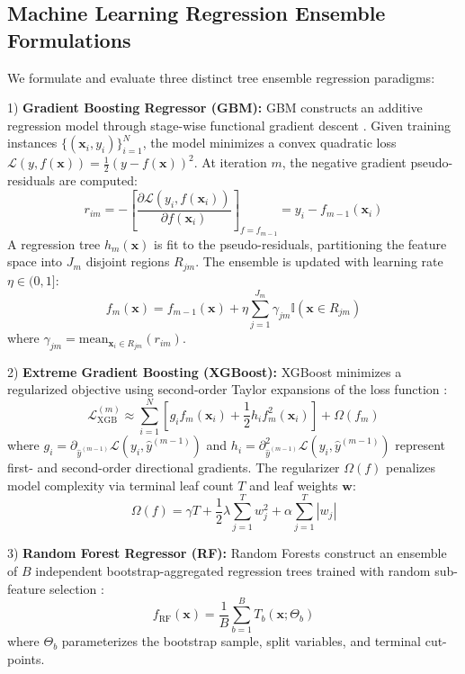 \documentclass[conference]{IEEEtran}
\begin{document}
\subsection{Machine Learning Regression Ensemble Formulations}
We formulate and evaluate three distinct tree ensemble regression paradigms:

1) \textbf{Gradient Boosting Regressor (GBM):}
GBM constructs an additive regression model through stage-wise functional gradient descent \cite{friedman2001}. Given training instances $\{(\mathbf{x}_i, y_i)\}_{i=1}^N$, the model minimizes a convex quadratic loss $\mathcal{L}(y, f(\mathbf{x})) = \frac{1}{2}(y - f(\mathbf{x}))^2$. At iteration $m$, the negative gradient pseudo-residuals are computed:
\begin{equation}
r_{im} = -\left[ \frac{\partial \mathcal{L}(y_i, f(\mathbf{x}_i))}{\partial f(\mathbf{x}_i)} \right]_{f = f_{m-1}} = y_i - f_{m-1}(\mathbf{x}_i)
\end{equation}
A regression tree $h_m(\mathbf{x})$ is fit to the pseudo-residuals, partitioning the feature space into $J_m$ disjoint regions $R_{jm}$. The ensemble is updated with learning rate $\eta \in (0, 1]$:
\begin{equation}
f_m(\mathbf{x}) = f_{m-1}(\mathbf{x}) + \eta \sum_{j=1}^{J_m} \gamma_{jm} \mathbb{I}(\mathbf{x} \in R_{jm})
\end{equation}
where $\gamma_{jm} = \text{mean}_{\mathbf{x}_i \in R_{jm}} (r_{im})$.

2) \textbf{Extreme Gradient Boosting (XGBoost):}
XGBoost minimizes a regularized objective using second-order Taylor expansions of the loss function \cite{chen2016}:
\begin{equation}
\mathcal{L}_{\text{XGB}}^{(m)} \approx \sum_{i=1}^N \left[ g_i f_m(\mathbf{x}_i) + \frac{1}{2} h_i f_m^2(\mathbf{x}_i) \right] + \Omega(f_m)
\end{equation}
where $g_i = \partial_{\hat{y}^{(m-1)}} \mathcal{L}(y_i, \hat{y}^{(m-1)})$ and $h_i = \partial^2_{\hat{y}^{(m-1)}} \mathcal{L}(y_i, \hat{y}^{(m-1)})$ represent first- and second-order directional gradients. The regularizer $\Omega(f)$ penalizes model complexity via terminal leaf count $T$ and leaf weights $\mathbf{w}$:
\begin{equation}
\Omega(f) = \gamma T + \frac{1}{2}\lambda \sum_{j=1}^T w_j^2 + \alpha \sum_{j=1}^T |w_j|
\end{equation}

3) \textbf{Random Forest Regressor (RF):}
Random Forests construct an ensemble of $B$ independent bootstrap-aggregated regression trees trained with random sub-feature selection \cite{breiman2001}:
\begin{equation}
f_{\text{RF}}(\mathbf{x}) = \frac{1}{B} \sum_{b=1}^B T_b(\mathbf{x}; \Theta_b)
\end{equation}
where $\Theta_b$ parameterizes the bootstrap sample, split variables, and terminal cut-points.
\end{document}
